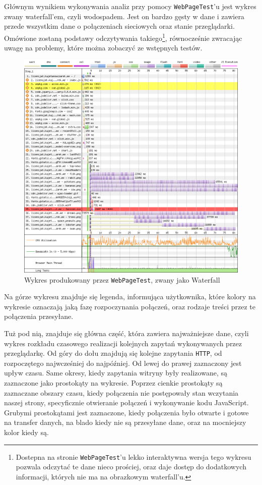 \documentclass[licencjacka]{pracadypl}
\begin{document}
Głównym wynikiem wykonywania analiz przy pomocy \texttt{WebPageTest}'u jest wykres zwany waterfall'em, czyli wodospadem. Jest on bardzo gęsty w dane i zawiera przede wszystkim dane o połączeniach sieciowych oraz stanie przeglądarki. Omówione zostaną podstawy odczytywania takiego\footnote{Dostepna na stronie \texttt{WebPageTest}'u lekko interaktywna wersja tego wykresu pozwala odczytać te dane nieco prościej, oraz daje dostęp do dodatkowych informacji, których nie ma na obrazkowym waterfall'u.}, równocześnie zwracając uwagę na problemy, które można zobaczyć ze wstępnych testów.
\begin{figure}[h!]
  \includegraphics[width=\linewidth]{images/base-waterfall-all-final.png}
  \caption{Wykres produkowany przez \texttt{WebPageTest}, zwany jako Waterfall}
  \label{fig:waterfall-base}
\end{figure}
Na górze wykresu znajduje się legenda, informująca użytkownika, które kolory na wykresie oznaczają jaką fazę rozpoczynania połączeń, oraz rodzaje treści przez te połączenia przesyłane. 

Tuż pod nią, znajduje się główna część, która zawiera najważniejsze dane, czyli wykres rozkładu czasowego realizacji kolejnych zapytań wykonywanych przez przeglądarkę. Od góry do dołu znajdują się kolejne zapytania \texttt{HTTP}, od rozpoczętego najwcześniej do najpóźniej. Od lewej do prawej zaznaczony jest upływ czasu. Same okresy, kiedy zapytania witryny były realizowane, są zaznaczone jako prostokąty na wykresie. Poprzez cienkie prostokąty są zaznaczane obszary czasu, kiedy połączenia nie postępowały stan wczytania naszej strony, specyficznie otwieranie połączeń i wykonywanie kodu JavaScript. Grubymi prostokątami jest zaznaczone, kiedy połączenia było otwarte i gotowe na transfer danych, na blado kiedy nie są przesyłane dane, oraz na mocniejszy kolor kiedy są.
\end{document}
